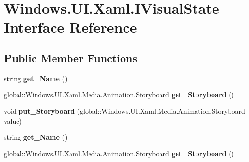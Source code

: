 \hypertarget{interface_windows_1_1_u_i_1_1_xaml_1_1_i_visual_state}{}\section{Windows.\+U\+I.\+Xaml.\+I\+Visual\+State Interface Reference}
\label{interface_windows_1_1_u_i_1_1_xaml_1_1_i_visual_state}
\subsection*{Public Member Functions}
\begin{DoxyCompactItemize}
\item 
\mbox{\label{interface_windows_1_1_u_i_1_1_xaml_1_1_i_visual_state_a72d7beda82f744c5a862ea0e03df818f}} 
string {\bfseries get\+\_\+\+Name} ()
\item 
\mbox{\label{interface_windows_1_1_u_i_1_1_xaml_1_1_i_visual_state_afc79a456f54434e91a54542427345efa}} 
global\+::\+Windows.\+U\+I.\+Xaml.\+Media.\+Animation.\+Storyboard {\bfseries get\+\_\+\+Storyboard} ()
\item 
\mbox{\label{interface_windows_1_1_u_i_1_1_xaml_1_1_i_visual_state_a654382a0a087af034454001b752d80df}} 
void {\bfseries put\+\_\+\+Storyboard} (global\+::\+Windows.\+U\+I.\+Xaml.\+Media.\+Animation.\+Storyboard value)
\item 
\mbox{\label{interface_windows_1_1_u_i_1_1_xaml_1_1_i_visual_state_a72d7beda82f744c5a862ea0e03df818f}} 
string {\bfseries get\+\_\+\+Name} ()
\item 
\mbox{\label{interface_windows_1_1_u_i_1_1_xaml_1_1_i_visual_state_afc79a456f54434e91a54542427345efa}} 
global\+::\+Windows.\+U\+I.\+Xaml.\+Media.\+Animation.\+Storyboard {\bfseries get\+\_\+\+Storyboard} ()
\item 
\mbox{\label{interface_windows_1_1_u_i_1_1_xaml_1_1_i_visual_state_a654382a0a087af034454001b752d80df}} 

\end{DoxyCompactItemize}
